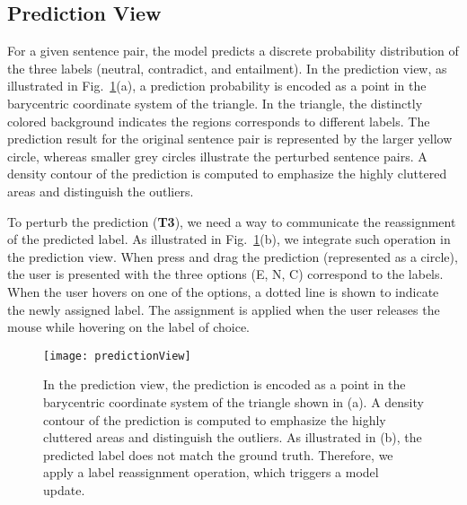 \subsection{Prediction View}
\label{sec:prediction}
For a given sentence pair, the model predicts a discrete probability distribution of the three labels (neutral, contradict, and entailment).
%
In the prediction view, as illustrated in Fig.~\ref{fig:predictionView}(a), a prediction probability is encoded as a point in the barycentric coordinate system of the triangle. In the triangle, the distinctly colored background indicates the regions corresponds to different labels. The prediction result for the original sentence pair is represented by the larger yellow circle, whereas smaller grey circles illustrate the perturbed sentence pairs. A density contour of the prediction is computed to emphasize the highly cluttered areas and distinguish the outliers.

To perturb the prediction (\textbf{T3}), we need a way to communicate the reassignment of the predicted label. As illustrated in Fig.~\ref{fig:predictionView}(b), we integrate such operation in the prediction view. When press and drag the prediction (represented as a circle), the user is presented with the three options (E, N, C) correspond to the labels. When the user hovers on one of the options, a dotted line is shown to indicate the newly assigned label. The assignment is applied when the user releases the mouse while hovering on the label of choice.

\begin{figure}[htbp]
\centering
\vspace{-2mm}
 \texttt{[image: predictionView]}
 \vspace{-2mm}
 \caption{
In the prediction view, the prediction is encoded as a point in the barycentric coordinate system of the triangle shown in (a).
A density contour of the prediction is computed to emphasize the highly cluttered areas and distinguish the outliers.
As illustrated in (b), the predicted label does not match the ground truth. Therefore, we apply a label reassignment operation, which triggers a model update.
 }
\label{fig:predictionView}
\end{figure}
